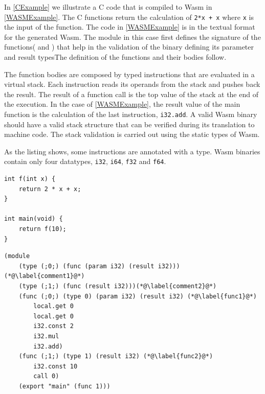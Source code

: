 In \autoref{CExample} we illustrate a C code that is compiled to Wasm in \autoref{WASMExample}. The C functions return the calculation of \texttt{2*x + x} where \texttt{x} is the input of the function. The code in \autoref{WASMExample} is in the textual format for the generated Wasm. The module in this case first defines the signature of the functions(  and  )  that help in the validation of the binary defining its parameter and result typesThe definition of the functions and their bodies follow. 

The function bodies are composed by typed instructions that are evaluated in a virtual stack. Each instruction reads its operands from the stack and pushes back the result. The result of a function call is the top value of the stack at the end of the execution. In the case of \autoref{WASMExample}, the result value of the main function is the calculation of the last instruction, \texttt{i32.add}. A valid Wasm binary should have a valid stack structure that can be verified during its translation to machine code. The stack validation is carried out using the static types of Wasm. 

As the listing shows, some instructions are annotated with a type. Wasm binaries contain only four datatypes, \texttt{i32}, \texttt{i64}, \texttt{f32} and \texttt{f64}. 

\begin{code}
\begin{lstlisting}[style=CStyle]
int f(int x) { 
    return 2 * x + x; 
}

int main(void) { 
    return f(10); 
}
\end{lstlisting}
    

\begin{lstlisting}
(module
    (type (;0;) (func (param i32) (result i32))) (*@\label{comment1}@*) 
    (type (;1;) (func (result i32)))(*@\label{comment2}@*) 
    (func (;0;) (type 0) (param i32) (result i32) (*@\label{func1}@*) 
        local.get 0
        local.get 0
        i32.const 2
        i32.mul
        i32.add)
    (func (;1;) (type 1) (result i32) (*@\label{func2}@*) 
        i32.const 10
        call 0)
    (export "main" (func 1)))
\end{lstlisting}
\end{code}

